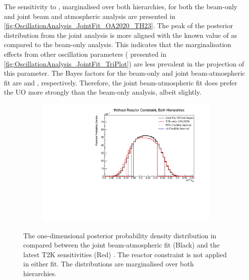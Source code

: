The sensitivity to , marginalised over both hierarchies, for both the beam-only and joint beam and atmospheric analysis are presented in \autoref{fig:OscillationAnalysis_JointFit_OA2020_TH23}. The peak of the posterior distribution from the joint analysis is more aligned with the known value of  as compared to the beam-only analysis. This indicates that the marginalisation effects from other oscillation parameters ( presented in \autoref{fig:OscillationAnalysis_JointFit_TriPlot}) are less prevalent in the projection of this parameter.
The Bayes factors for the beam-only and joint beam-atmospheric fit are  and , respectively. Therefore, the joint beam-atmospheric fit does prefer the UO more strongly than the beam-only analysis, albeit slightly.

\begin{figure}[h]
  \begin{subfigure}[t]{0.98\textwidth}
    \includegraphics[width=\textwidth, trim={0mm 0mm 0mm 0mm}, clip,page=1]{Figures/OA/JointFit_OA2020_Comp/ContourComparison_1D_th23_BH_2_woRC_UnSmeared_CredibleInterval.pdf}
  \end{subfigure}
  \caption{The one-dimensional posterior probability density distribution in  compared between the joint beam-atmospheric fit (Black) and the latest T2K sensitivities (Red) \cite{t2k_tn_399}. The reactor constraint is not applied in either fit. The distributions are marginalised over both hierarchies.}
  \label{fig:OscillationAnalysis_JointFit_OA2020_TH23}
\end{figure}

